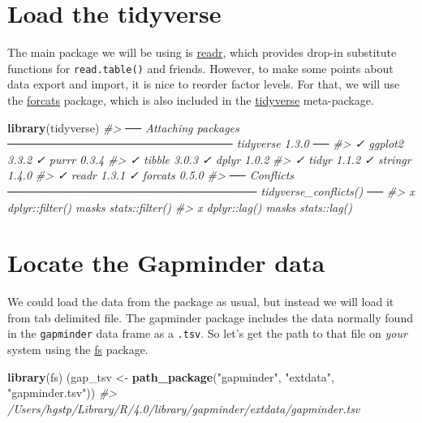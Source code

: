 \documentclass[
]{book}
\newenvironment{Shaded}{\begin{snugshade}}{\end{snugshade}}
\newcommand{\CommentTok}[1]{\textcolor[rgb]{0.56,0.35,0.01}{\textit{#1}}}
\newcommand{\KeywordTok}[1]{\textcolor[rgb]{0.13,0.29,0.53}{\textbf{#1}}}
\newcommand{\NormalTok}[1]{#1}
\newcommand{\StringTok}[1]{\textcolor[rgb]{0.31,0.60,0.02}{#1}}
\begin{document}
\hypertarget{load-the-tidyverse}{%
\section{Load the tidyverse}\label{load-the-tidyverse}}

The main package we will be using is \href{https://readr.tidyverse.org}{readr}, which provides drop-in substitute functions for \texttt{read.table()} and friends. However, to make some points about data export and import, it is nice to reorder factor levels. For that, we will use the \href{https://forcats.tidyverse.org}{forcats} package, which is also included in the \href{https://tidyverse.tidyverse.org}{tidyverse} meta-package.

\begin{Shaded}
\begin{Highlighting}[]
\KeywordTok{library}\NormalTok{(tidyverse)}
\CommentTok{#> ── Attaching packages ──────────────────────────── tidyverse 1.3.0 ──}
\CommentTok{#> ✓ ggplot2 3.3.2     ✓ purrr   0.3.4}
\CommentTok{#> ✓ tibble  3.0.3     ✓ dplyr   1.0.2}
\CommentTok{#> ✓ tidyr   1.1.2     ✓ stringr 1.4.0}
\CommentTok{#> ✓ readr   1.3.1     ✓ forcats 0.5.0}
\CommentTok{#> ── Conflicts ─────────────────────────────── tidyverse_conflicts() ──}
\CommentTok{#> x dplyr::filter() masks stats::filter()}
\CommentTok{#> x dplyr::lag()    masks stats::lag()}
\end{Highlighting}
\end{Shaded}

\hypertarget{locate-the-gapminder-data}{%
\section{Locate the Gapminder data}\label{locate-the-gapminder-data}}

We could load the data from the package as usual, but instead we will load it from tab delimited file. The gapminder package includes the data normally found in the \texttt{gapminder} data frame as a \texttt{.tsv}. So let's get the path to that file on \emph{your} system using the \href{https://fs.r-lib.org/index.html}{fs} package.

\begin{Shaded}
\begin{Highlighting}[]
\KeywordTok{library}\NormalTok{(fs)}
\NormalTok{(gap_tsv <-}\StringTok{ }\KeywordTok{path_package}\NormalTok{(}\StringTok{"gapminder"}\NormalTok{, }\StringTok{"extdata"}\NormalTok{, }\StringTok{"gapminder.tsv"}\NormalTok{))}
\CommentTok{#> /Users/hgstp/Library/R/4.0/library/gapminder/extdata/gapminder.tsv}
\end{Highlighting}
\end{Shaded}
\end{document}
